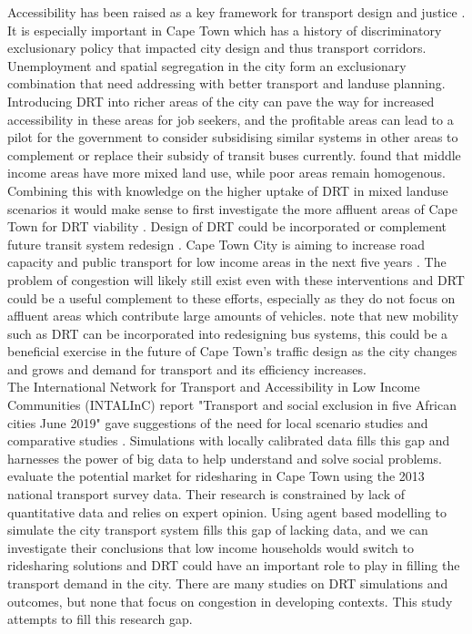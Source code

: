 \documentclass[a4paper]{article}
\begin{document}
Accessibility has been raised as a key framework for transport design and justice \citep{Access}. It is especially important in Cape Town which has a history of discriminatory exclusionary policy that impacted city design and thus transport corridors. Unemployment and spatial segregation in the city form an exclusionary combination that need addressing with better transport and landuse planning. Introducing DRT into richer areas of the city can pave the way for increased accessibility in these areas for job seekers, and the profitable areas can lead to a pilot for the government to consider subsidising similar systems in other areas to complement or replace their subsidy of transit buses currently. \citealp{Moyo} found that middle income areas have more mixed land use, while poor areas remain homogenous. Combining this with knowledge on the higher uptake of DRT in mixed landuse scenarios it would make sense to first investigate the more affluent areas of Cape Town for DRT viability \citep{yu2019exploring}.
Design of DRT could be incorporated or complement future transit system redesign \citep{byala2021redesigning}.
Cape Town City is aiming to increase road capacity and public transport for low income areas in the next five years \citep{IDP}. The problem of congestion will likely still exist even with these interventions and DRT could be a useful complement to these efforts, especially as they do not focus on affluent areas which contribute large amounts of vehicles. \citealp{byala2021redesigning} note that new mobility such as DRT can be incorporated into redesigning bus systems, this could be a beneficial exercise in the future of Cape Town’s traffic design as the city changes and grows and demand for transport and its efficiency increases.\\

The International Network for Transport and Accessibility in Low Income Communities (INTALInC) report "Transport and social exclusion in five African cities June 2019" gave suggestions of the need for local scenario studies and comparative studies \citep{lucas2019transport}. Simulations with locally calibrated data fills this gap and harnesses the power of big data to help understand and solve social problems.
\citealp{vanderschuren2018ride} evaluate the potential market for ridesharing in Cape Town using the 2013 national transport survey data. Their research is constrained by lack of quantitative data and relies on expert opinion. 
Using agent based modelling to simulate the city transport system fills this gap of lacking data, and we can investigate their conclusions that low income households would switch to ridesharing solutions and DRT could have an important role to play in filling the transport demand in the city.
There are many studies on DRT simulations and outcomes, but none that focus on congestion in developing contexts. This study attempts to fill this research gap.\\
\end{document}
